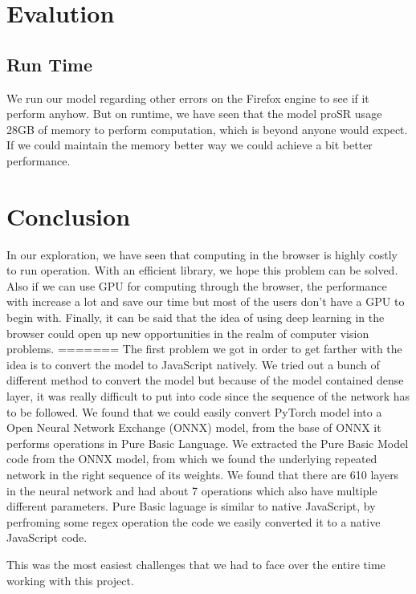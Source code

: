 \documentclass[a4paper,12pt]{article}
\begin{document}
\section{Evalution}
\subsection{Run Time}
We run our model regarding other errors on the Firefox engine to see if it perform anyhow. But on runtime, we have seen that the model proSR usage 28GB of memory to perform computation, which is beyond anyone would expect. If we could maintain the memory better way we could achieve a bit better performance.

\section{Conclusion}
 In our exploration, we have seen that computing in the browser is highly costly to run operation. With an efficient library, we hope this problem can be solved. Also if we can use GPU for computing through the browser, the performance with increase a lot and save our time but most of the users don't have a GPU to begin with. Finally, it can be said that the idea of using deep learning in the browser could open up new opportunities in the realm of computer vision problems. 
=======
The first problem we got in order to get farther with the idea is to convert the model to JavaScript natively. We tried out a bunch of different method to convert the model but because of the model contained dense layer, it was really difficult to put into code since the sequence of the network has to be followed. We found that we could easily convert PyTorch model into a  Open Neural Network Exchange (ONNX) model, from the base of ONNX it performs operations in Pure Basic Language. We extracted the Pure Basic Model code from the ONNX model, from which we found the underlying repeated network in the right sequence of its weights. We found that there are 610 layers in the neural network and had about 7 operations which also have multiple different parameters. Pure Basic laguage is similar to native JavaScript, by perfroming some regex operation the code we easily converted it to a native JavaScript code. 

This was the most easiest challenges that we had to face over the entire time working with this project.
\end{document}
